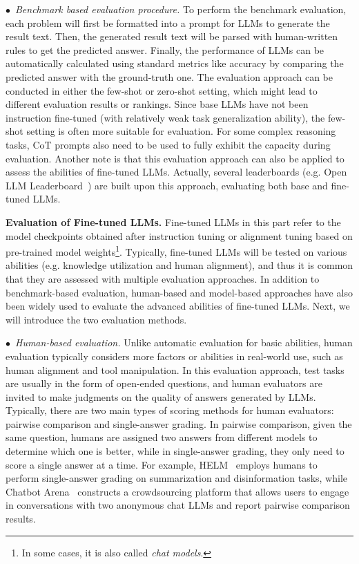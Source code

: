 {{$\bullet$~\emph{Benchmark based evaluation procedure.} To perform the benchmark evaluation, each problem will first be formatted into a prompt for LLMs to generate the result text. Then, the generated result text will be parsed with human-written rules to get the predicted answer. Finally, the performance of LLMs can be automatically calculated using standard metrics like accuracy by comparing the predicted answer with the ground-truth one. The evaluation approach can be conducted in either the few-shot or zero-shot setting, which might lead to different evaluation results or rankings. Since base LLMs have not been instruction fine-tuned (with relatively weak task generalization ability), the few-shot setting is often more suitable for evaluation. For some complex reasoning tasks, CoT prompts also need to be used to fully exhibit the capacity during evaluation. Another note is that this evaluation approach can also be applied to assess the abilities of fine-tuned LLMs. Actually, several leaderboards (e.g. Open LLM Leaderboard~\cite{Edward-2023-hf-open}) are built upon this approach, evaluating both base and fine-tuned LLMs.

\textbf{Evaluation of Fine-tuned LLMs.} Fine-tuned LLMs in this part refer to the model checkpoints obtained after instruction tuning or alignment tuning based on pre-trained model weights\footnote{In some cases, it is also called \emph{chat models}.}. Typically, fine-tuned LLMs will be tested on various abilities (e.g. knowledge utilization and human alignment), and thus it is common that they are assessed with multiple evaluation approaches. In addition to benchmark-based evaluation, human-based and model-based approaches have also been widely used to evaluate the advanced abilities of fine-tuned LLMs. Next, we will introduce the two evaluation methods.

$\bullet$~\emph{Human-based evaluation.} Unlike automatic evaluation for basic abilities, human evaluation typically considers more factors or abilities  in real-world use, such as human alignment and tool manipulation. In this evaluation approach, test tasks are usually in the form of open-ended questions, and human evaluators are invited to  make judgments on the quality of answers generated by LLMs. Typically, there are two main types of scoring methods for human evaluators: pairwise comparison and single-answer grading. In pairwise comparison, given the same question, humans are assigned two answers from different models to determine which one is better, while in single-answer grading, they only need to score a single answer at a time. For example, HELM~\cite{Liang-arxiv-2022-Holistic} employs humans to perform single-answer grading on summarization and disinformation tasks, while Chatbot Arena~\cite{Zheng-2023-arxiv-Judging} constructs a crowdsourcing platform that allows users to engage in conversations with two anonymous chat LLMs and report pairwise comparison results.

}}
